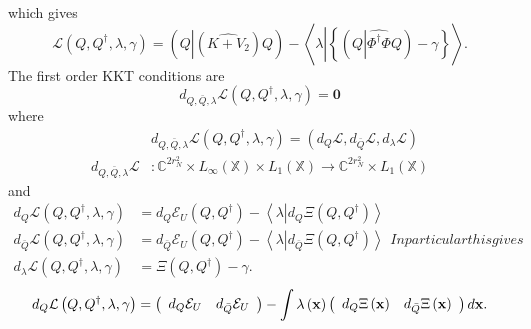 \documentclass[aps,preprint]{revtex4}%
\begin{document}
which gives
\begin{equation}
\mathcal{L}\left(  Q,Q^{\dagger},\lambda,\gamma\right)  =\left(  Q\left\vert
\left(  \widehat{K+V_{2}}\right)  Q\right.  \right)  -\left\langle
\lambda\left\vert \left\{  \left(  Q\left\vert \widehat{\Phi^{\dagger}\Phi
}Q\right.  \right)  -\gamma\right\}  \right.  \right\rangle .
\end{equation}
The first order KKT conditions \cite{KKT} are%
\begin{equation}
d_{Q,\bar{Q},\lambda}\mathcal{L}\left(  Q,Q^{\dagger},\lambda,\gamma\right)
=\mathbf{0}%
\end{equation}
where
\begin{align}
&  d_{Q,\bar{Q},\lambda}\mathcal{L}\left(  Q,Q^{\dagger},\lambda
,\gamma\right)  =\left(  d_{Q}\mathcal{L},d_{\bar{Q}}\mathcal{L},d_{\lambda
}\mathcal{L}\right) \nonumber\\
d_{Q,\bar{Q},\lambda}\mathcal{L}  &  :\mathbb{C}^{2r_{N}^{2}}\times L_{\infty
}\left(  \mathbb{X}\right)  \times L_{1}\left(  \mathbb{X}\right)
\rightarrow\mathbb{C}^{2r_{N}^{2}}\times L_{1}\left(  \mathbb{X}\right)
\end{align}
and%
\begin{subequations}
\begin{align}
d_{Q}\mathcal{L}\left(  Q,Q^{\dagger},\lambda,\gamma\right)   &
=d_{Q}\mathcal{E}_{U}\left(  Q,Q^{\dagger}\right)  -\left\langle
\lambda\left\vert d_{Q}\Xi\left(  Q,Q^{\dagger}\right)  \right.  \right\rangle
\\
d_{\bar{Q}}\mathcal{L}\left(  Q,Q^{\dagger},\lambda,\gamma\right)   &
=d_{\bar{Q}}\mathcal{E}_{U}\left(  Q,Q^{\dagger}\right)  -\left\langle
\lambda\left\vert d_{\bar{Q}}\Xi\left(  Q,Q^{\dagger}\right)  \right.
\right\rangle \\
d_{\lambda}\mathcal{L}\left(  Q,Q^{\dagger},\lambda,\gamma\right)   &
=\Xi\left(  Q,Q^{\dagger}\right)  -\gamma.
\end{align}
In particular this gives
\end{subequations}
\begin{equation}
d_{Q}\mathcal{L}\left(  Q,Q^{\dagger},\lambda,\gamma\right)  =\left(
\begin{array}
[c]{cc}%
d_{Q}\mathcal{E}_{U} & d_{\bar{Q}}\mathcal{E}_{U}%
\end{array}
\right)  -\int\lambda\left(  \mathbf{x}\right)  \left(
\begin{array}
[c]{cc}%
d_{Q}\Xi\left(  \mathbf{x}\right)  & d_{\bar{Q}}\Xi\left(  \mathbf{x}\right)
\end{array}
\right)  d\mathbf{x.}%
\end{equation}
\end{document}
